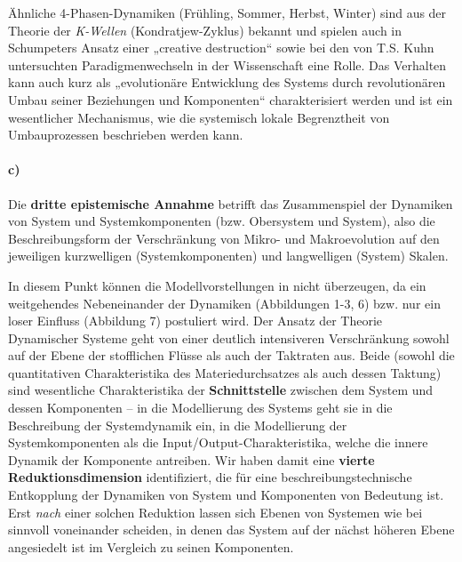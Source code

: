 \documentclass[11pt,a4paper]{article}
\begin{document}
Ähnliche 4-Phasen-Dynamiken (Frühling, Sommer, Herbst, Winter) sind aus der
Theorie der \emph{K-Wellen} (Kondratjew-Zyklus) bekannt und spielen auch in
Schumpeters Ansatz einer „creative destruction“ sowie bei den von T.S. Kuhn
untersuchten Paradigmenwechseln in der Wissenschaft eine Rolle. Das Verhalten
kann auch kurz als „evolutionäre Entwicklung des Systems durch revolutionären
Umbau seiner Beziehungen und Komponenten“ charakterisiert werden und ist ein
wesentlicher Mechanismus, wie die systemisch lokale Begrenztheit von
Umbauprozessen beschrieben werden kann.

\paragraph{c)}
Die \textbf{dritte epistemische Annahme} betrifft das Zusammenspiel der
Dynamiken von System und Systemkomponenten (bzw.  Obersystem und System), also
die Beschreibungsform der Verschränkung von Mikro- und Makroevolution auf den
jeweiligen kurzwelligen (Systemkomponenten) und langwelligen (System) Skalen.

In diesem Punkt können die Modellvorstellungen in \cite{Holling2000} nicht
überzeugen, da ein weitgehendes Nebeneinander der Dynamiken (Abbildungen 1-3,
6) bzw. nur ein loser Einfluss (Abbildung 7) postuliert wird. Der Ansatz der
Theorie Dynamischer Systeme geht von einer deutlich intensiveren Verschränkung
sowohl auf der Ebene der stoff\-lichen Flüsse als auch der Takt\-raten
aus. Beide (sowohl die quantitativen Charakteristika des Materiedurchsatzes
als auch dessen Taktung) sind wesentliche Charakteristika der
\textbf{Schnittstelle} zwischen dem System und dessen Komponenten -- in die
Modellierung des Systems geht sie in die Beschreibung der Systemdynamik ein,
in die Modellierung der Systemkomponenten als die
Input/Output-Charakteristika, welche die innere Dynamik der Komponente
antreiben. Wir haben damit eine \textbf{vierte Reduktionsdimension}
identifiziert, die für eine beschreibungstechnische Entkopplung der Dynamiken
von System und Komponenten von Bedeutung ist. Erst \emph{nach} einer solchen
Reduktion lassen sich Ebenen von Systemen wie bei \cite{Holling2000} sinnvoll
voneinander scheiden, in denen das System auf der nächst höheren Ebene
angesiedelt ist im Vergleich zu seinen Komponenten.
\end{document}

